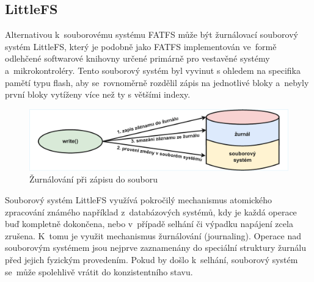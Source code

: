 
\subsection{LittleFS}
\label{littlefs}
Alternativou k~souborovému systému FATFS může být žurnálovací souborový systém LittleFS, který je podobně jako FATFS implementován ve~formě odlehčené softwarové knihovny určené primárně pro vestavěné systémy a~mikrokontroléry.  Tento souborový systém byl vyvinut s ohledem na specifika pamětí typu flash, aby se~rovnoměrně rozdělil zápis na jednotlivé bloky a~nebyly první bloky vytíženy více než ty s většími indexy.~\cite{nxp_the_design_of_the_little_filesystem}

\begin{figure}[h]
    \centering
    \includegraphics[width=1.00\textwidth]{obrazky-figures/journaling-experimental-2_cropped.pdf}
    
    \caption{Žurnálování při zápisu do souboru~\cite{architecture_and_design_of_the_linux_storage_stack}}
    \label{fig:journaling}
\end{figure}


Souborový systém LittleFS využívá pokročilý mechanismus atomického zpracování známého například z~databázových systémů, kdy je každá operace buď kompletně dokončena, nebo v~případě selhání či výpadku napájení zcela zrušena. K~tomu je využit mechanismus žurnálování (journaling). Operace nad souborovým systémem jsou nejprve zaznamenány do speciální struktury žurnálu před jejich fyzickým provedením. Pokud by došlo k~selhání, souborový systém se~může spolehlivě vrátit do konzistentního stavu.~\cite{nxp_the_design_of_the_little_filesystem}

